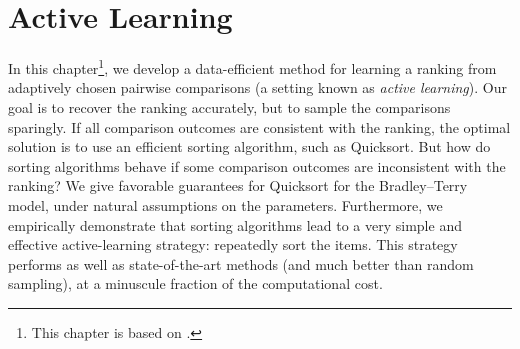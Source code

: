 \chapter{Active Learning}
\label{ch:robustsort}

In this chapter\footnote{%
This chapter is based on \citet{maystre2017just}.},
we develop a data-efficient method for learning a ranking from adaptively chosen pairwise comparisons (a setting known as \emph{active learning}).
Our goal is to recover the ranking accurately, but to sample the comparisons sparingly.
If all comparison outcomes are consistent with the ranking, the optimal solution is to use an efficient sorting algorithm, such as Quicksort.
But how do sorting algorithms behave if some comparison outcomes are inconsistent with the ranking?
We give favorable guarantees for Quicksort for the Bradley--Terry model, under natural assumptions on the parameters.
Furthermore, we empirically demonstrate that sorting algorithms lead to a very simple and effective active-learning strategy: repeatedly sort the items.
This strategy performs as well as state-of-the-art methods (and much better than random sampling), at a minuscule fraction of the computational cost.








